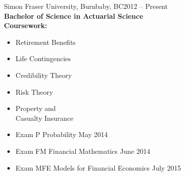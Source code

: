 \documentclass[11pt]{article}
\def\university{Simon Fraser University}
\def\universitycity{Burnbaby, BC}
\def\universitydate{2012 -- Present}
\def\degree{Bachelor of Science in Actuarial Science}
\def\gpa{}
\begin{document}
\afterpage{\cfoot{\thepage}}

\large
{}

\vspace{1mm}
\begin{addmargin}[3em]{0em}
\university, \universitycity \hfill \universitydate \\
\textbf{\degree} \hfill \gpa \\
\textbf{Coursework:} \vspace{-4mm}
\end{addmargin}
%
\begin{addmargin}[2.75em]{0em}
\begin{multicols}{3}
\begin{itemize}
\setlength\itemsep{-0.4em}
\item Retirement Benefits
\item Life Contingencies 
\item Credibility Theory 
\item Risk Theory
\item Property and \\\mbox{Casualty} Insurance
\end{itemize}
\end{multicols} \vspace{-4mm}
%
\end{addmargin}

\medskip
{}

\vspace{1mm}

\begin{addmargin}[0.9em]{0em}
\begin{itemize}
\setlength\itemsep{-0.4em}
\item[] Exam P \hspace{14mm} Probability \hfill May 2014 %
\item[] Exam FM \hspace{10.25mm} Financial Mathematics \hfill June 2014  %
\item[] Exam MFE \hspace{7.8mm} Models for Financial Economics \hfill July 2015 %
\end{itemize}
\end{addmargin}
\end{document}

